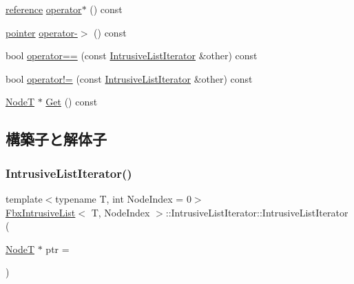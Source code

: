 \begin{DoxyCompactItemize}
\hyperlink{class_fbx_intrusive_list_aa927f048081371fe74dff673d3a5a8ad}{reference} \hyperlink{class_fbx_intrusive_list_1_1_intrusive_list_iterator_aaeb3fe3d4aa1bb369c982a86874bead7}{operator$\ast$} () const
\item 
\hyperlink{class_fbx_intrusive_list_ad04ad10d67ddd0d4104b172839c908d7}{pointer} \hyperlink{class_fbx_intrusive_list_1_1_intrusive_list_iterator_ad699b071c709f496ca56d77c463d6a3a}{operator-\/$>$} () const
\item 
bool \hyperlink{class_fbx_intrusive_list_1_1_intrusive_list_iterator_a5d1689422d59c3ed59daeacb687b7a24}{operator==} (const \hyperlink{class_fbx_intrusive_list_1_1_intrusive_list_iterator}{Intrusive\+List\+Iterator} \&other) const
\item 
bool \hyperlink{class_fbx_intrusive_list_1_1_intrusive_list_iterator_a2b302e93dfb6cff66399273730d24c84}{operator!=} (const \hyperlink{class_fbx_intrusive_list_1_1_intrusive_list_iterator}{Intrusive\+List\+Iterator} \&other) const
\item 
\hyperlink{class_fbx_intrusive_list_a6ffda382a6d029a042cbb0110853680c}{NodeT} $\ast$ \hyperlink{class_fbx_intrusive_list_1_1_intrusive_list_iterator_ae4510214381d82038e1b2c37cd3f0c20}{Get} () const
\end{DoxyCompactItemize}


\subsection{構築子と解体子}
\mbox{\label{class_fbx_intrusive_list_1_1_intrusive_list_iterator_a69f65667269661a51103f7c8bc8bffac}} 
\subsubsection{\texorpdfstring{Intrusive\+List\+Iterator()}{IntrusiveListIterator()}}
{\footnotesize\ttfamily template$<$typename T, int Node\+Index = 0$>$ \\
\hyperlink{class_fbx_intrusive_list}{Fbx\+Intrusive\+List}$<$ T, Node\+Index $>$\+::Intrusive\+List\+Iterator\+::\+Intrusive\+List\+Iterator (\begin{DoxyParamCaption}\item[{\hyperlink{class_fbx_intrusive_list_a6ffda382a6d029a042cbb0110853680c}{NodeT} $\ast$}]{ptr = {} }\end{DoxyParamCaption})\hspace{0.3cm}{\ttfamily [explicit]}}



